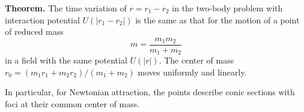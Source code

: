 \textbf{Theorem.} The time variation of $r = r_1 - r_2$ in the two-body problem with interaction potential $U(|r_1 - r_2|)$ is the same as that for the motion of a point of reduced mass
$$m = \frac{m_1 m_2}{m_1 + m_2}$$
in a field with the same potential $U(|r|)$. The center of mass $r_0 = (m_1 r_1 + m_2 r_2)/(m_1 + m_2)$ moves uniformly and linearly.

In particular, for Newtonian attraction, the points describe conic sections with foci at their common center of mass.
